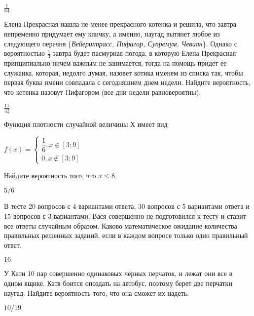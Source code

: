 \documentclass[12pt, addpoints, answers]{exam} %
\begin{document}
\begin{questions}
\begin{solution}
 $\frac{1}{64}$
\end{solution}

\question Елена Прекрасная нашла не менее прекрасного котенка и решила, что завтра непременно придумает ему кличку, а именно, наугад вытянет любое из следующего перечня \{{\it Вейерштрасс, Пифагор, Супремум, Чевиан}\}. Однако с вероятностью $\frac{1}{3}$ завтра будет пасмурная погода, в которую Елена Прекрасная принципиально ничем важным не занимается, тогда на помощь придет ее служанка, которая, недолго думая, назовет котика именем из списка так, чтобы первая буква имени совпадала с сегодняшнем днем недели. Найдите вероятность, что котенка назовут Пифагором (все дни недели равновероятны).


\begin{solution}
 $\frac{11}{42}$
\end{solution}

\question Функция плотности случайной величины Х имеет вид

\begin{center}
	$f(x)= \begin{cases}
	\dfrac{1}{6}, x\in [3;9]\\
	0, x\notin [3;9]
\end{cases}$
\end{center}
 Найдите вероятность того, что $x\le 8 $.

\begin{solution}
 $5/6$
\end{solution} 



\question В тесте 20 вопросов с 4 вариантами ответа, 30 вопросов с 5 вариантами ответа и 15 вопросов с 3 вариантами. Вася совершенно не подготовился к тесту и ставит все ответы случайным образом. Каково математическое ожидание количества правильных решенных заданий, если в каждом вопросе только один правильный ответ.

\begin{solution}
 $16$
\end{solution}

\question У Кати 10 пар совершенно одинаковых чёрных перчаток, и лежат они все в одном ящике. Катя боится опоздать на автобус, поэтому берет две перчатки наугад. Найдите вероятность того, что она сможет их надеть.

\begin{solution}
 $10/19$
\end{solution}


\end{questions}
\end{document}
